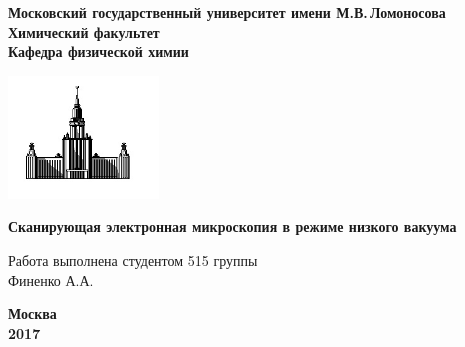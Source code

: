 \documentclass[12pt]{article}
\begin{document}
 

\begin{titlepage}
\centering
\textbf{\large Московский государственный университет имени М.В.\,Ломоносова\\
\vspace*{0.1cm} Химический факультет\\
\vspace*{0.1cm}
\noindent\makebox[\linewidth]{\rule{\paperwidth}{0.4pt}}
\vspace*{0.1cm}
 Кафедра физической химии}
\vspace*{2cm}

\begin{center}
\includegraphics[width=0.3\textwidth]{pictures/logo.jpg}
\end{center}

\vspace*{2cm}
\Large \textbf{Сканирующая электронная микроскопия в режиме низкого вакуума} 
\vspace*{6cm}

\begin{flushright}
\large Работа выполнена студентом 515 группы\\
Финенко А.А.\\
\end{flushright}
\vfill
\large\textbf{Москва\\ 2017}
\end{titlepage}
\end{document}
